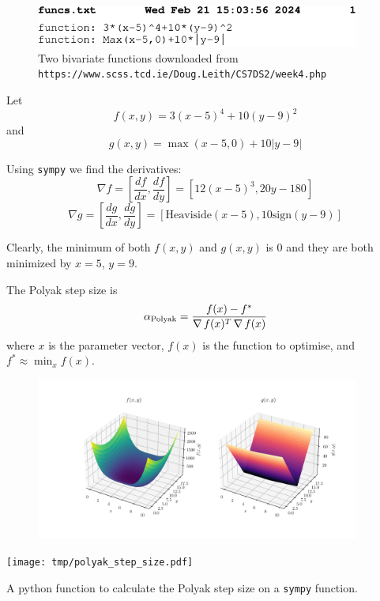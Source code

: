 

\begin{figure}
  \begin{center}
    \includegraphics[width=0.95\textwidth]{funcs.pdf}
  \end{center}
  \caption{Two bivariate functions downloaded from \texttt{https://www.scss.tcd.ie/Doug.Leith/CS7DS2/week4.php}}\label{lst:funcs.txt}
\end{figure}


Let \begin{equation}
  f(x,y)=3(x-5)^4+10(y-9)^2
  \label{eq:f}
\end{equation}
and 
\begin{equation}
  g(x,y)=\max(x-5,0)+10|y-9|
  \label{eq:g}
\end{equation}

Using \texttt{sympy} we find the derivatives:
$$\nabla f=[\frac{df}{dx},\frac{df}{dy}]=[12(x-5)^{3},20y-180]$$
$$\nabla g=[\frac{dg}{dx},\frac{dg}{dy}]=[\text{Heaviside}(x-5),10\text{sign}(y-9)]$$


Clearly, the minimum of both $f(x,y)$ and $g(x,y)$ is $0$ and they are both minimized by $x=5$, $y=9$.

The Polyak step size is \begin{equation}
  \alpha_{\text{Polyak}}=\frac{f(x)-f^*}{\operatorname*{\nabla} f(x)^T\operatorname*{\nabla} f(x)}
  \label{eq:polyak-step}
\end{equation}
where $x$ is the parameter vector, $f(x)$ is the function to optimise, and $f^*\approx\min_xf(x)$.

\begin{figure}
  \begin{center}
    \includegraphics[width=0.95\textwidth]{fig/f-g.pdf}
  \end{center}
  \caption{}\label{fig:f-and-g}
\end{figure}

\begin{listing}
  \texttt{[image: tmp/polyak\_step\_size.pdf]}
  \caption{A python function to calculate the Polyak step size on a \texttt{sympy} function.}
  \label{lst:polyak-step}
\end{listing}
